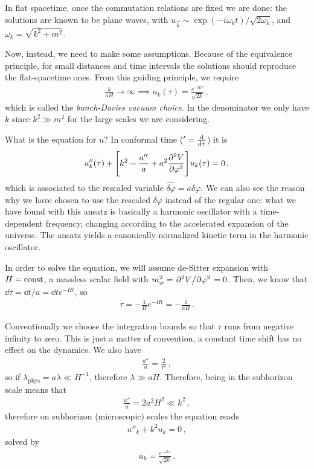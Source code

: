 \documentclass[main.tex]{subfiles}
\begin{document}
In flat spacetime, once the commutation relations are fixed we are done: the solutions are known to be plane waves, with \(u_{\vec{k}} \sim \exp(- i \omega _k t) / \sqrt{2 \omega _k}\), and \(\omega _k = \sqrt{k^2 + m^2}\). 

Now, instead, we need to make some assumptions. Because of the equivalence principle, for small distances and time intervals the solutions should reproduce the flat-spacetime ones. 
From this guiding principle, we require 
%
\begin{align}
\frac{k}{aH} \to \infty \implies 
u_k (\tau ) = \frac{e^{-i k \tau }}{\sqrt{2 k}}
\,,
\end{align}
%
which is called the \emph{bunch-Davies vacuum choice}.
In the denominator we only have \(k\) since \(k^2\gg m^2\) for the large scales we are considering. 

What is the equation for \(u\)? In conformal time (\(' = \dv{}{\tau }\)) it is 
%
\begin{align}
u''_k (\tau ) + \qty[k^2  - \frac{a''}{a} + a^2 \pdv[2]{V}{\varphi }] u_k (\tau ) = 0
\,,
\end{align}
%
which is associated to the rescaled variable \( \hat{ \delta \varphi} = a \delta \varphi \). 
We can also see the reason why we have chosen to use the rescaled \(\delta \varphi \) instead of the regular one: what we have found with this ansatz is basically a harmonic oscillator with a time-dependent frequency, changing according to the accelerated expansion of the universe. 
The ansatz yields a canonically-normalized kinetic term in the harmonic oscillator. 

In order to solve the equation, we will assume de-Sitter expansion with \(H = \text{const}\), a massless scalar field with \(m_\varphi^2 = \pdv*[2]{V}{\varphi } = 0\). 
Then, we know that \(\dd{\tau } = \dd{t} / a = \dd{t} e^{-Ht}\), so 
%
\begin{align}
\tau = - \frac{1}{H} e^{-Ht} = - \frac{1}{aH}
\,.
\end{align}

Conventionally we choose the integration bounds so that \(\tau \) runs from negative infinity to zero. This is just a matter of convention, a constant time shift has no effect on the dynamics. We also have 
%
\begin{align}
\frac{a''}{a} = \frac{2}{\tau^2}
\,,
\end{align}
%
so if \(\lambda _{\text{phys}} = a \lambda \ll H^{-1}\), therefore \(\lambda \gg aH\). Therefore, being in the subhorizon scale means that 
%
\begin{align}
\frac{a''}{a} = 2 a^2 H^2 \ll k^2
\,,
\end{align}
%
therefore on subhorizon (microscopic) scales the equation reads 
%
\begin{align}
u''_k + k^2 u_k = 0
\,,
\end{align}
%
solved by 
%
\begin{align}
u_k = \frac{e^{-ik \tau }}{\sqrt{2 k }}
\,.
\end{align}
\end{document}
